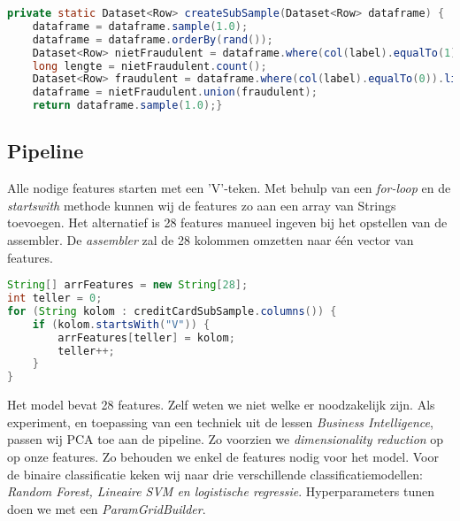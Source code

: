 \documentclass[a4paper,10pt,twoside]{report}
\begin{document}
\begin{lstlisting}[language=Java]
private static Dataset<Row> createSubSample(Dataset<Row> dataframe) {
	dataframe = dataframe.sample(1.0);
	dataframe = dataframe.orderBy(rand());
	Dataset<Row> nietFraudulent = dataframe.where(col(label).equalTo(1));
	long lengte = nietFraudulent.count();
	Dataset<Row> fraudulent = dataframe.where(col(label).equalTo(0)).limit((int) lengte);
	dataframe = nietFraudulent.union(fraudulent);
	return dataframe.sample(1.0);}
\end{lstlisting}

\subsection*{Pipeline}

Alle nodige features starten met een 'V'-teken. Met behulp van een \textit{for-loop} en de \textit{startswith} methode kunnen wij de features zo aan een array van Strings toevoegen. Het alternatief is 28 features manueel ingeven bij het opstellen van de assembler. De \textit{assembler} zal de 28 kolommen omzetten naar één vector van features.

\begin{lstlisting}[language=Java]
String[] arrFeatures = new String[28];
int teller = 0;
for (String kolom : creditCardSubSample.columns()) {
	if (kolom.startsWith("V")) {
		arrFeatures[teller] = kolom;
		teller++;
	}
}
\end{lstlisting}

Het model bevat 28 features. Zelf weten we niet welke er noodzakelijk zijn. Als experiment, en toepassing van een techniek uit de lessen \textit{Business Intelligence}, passen wij PCA toe aan de pipeline. Zo voorzien we \textit{dimensionality reduction} op op onze features. Zo behouden we enkel de features nodig voor het model. Voor de binaire classificatie keken wij naar drie verschillende classificatiemodellen: \textit{Random Forest, Lineaire SVM en logistische regressie}. Hyperparameters tunen doen we met een \textit{ParamGridBuilder}. 
\end{document}
